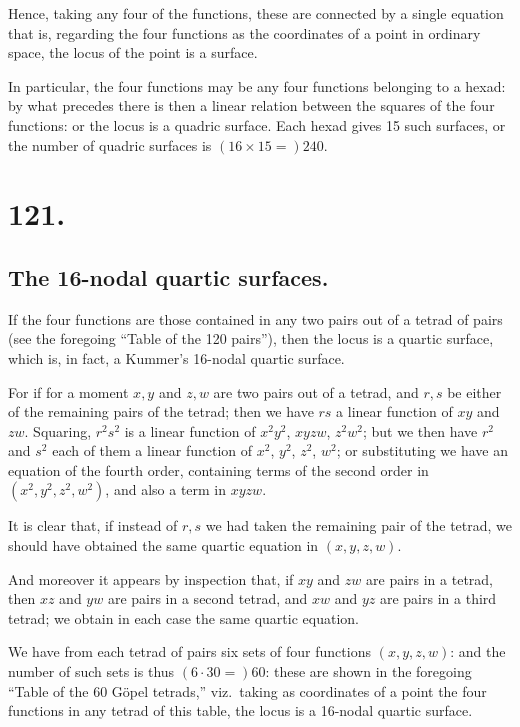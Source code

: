 \documentclass[11pt,a4paper]{book}
\begin{document}
Hence, taking any four of the functions, these are connected by a single equation that is, regarding the four functions as the coordinates of a point in ordinary space, the locus of the point is a surface.

In particular, the four functions may be any four functions belonging to a hexad: by what precedes there is then a linear relation between the squares of the four functions: or the locus is a quadric surface. Each hexad gives 15 such surfaces, or the number of quadric surfaces is $(16 \times 15 =) 240$.

\newpage
\section*{121.}
\label{sec:121}

\subsection*{The 16-nodal quartic surfaces.}

If the four functions are those contained in any two pairs out of a tetrad of pairs (see the foregoing ``Table of the 120 pairs''), then the locus is a quartic surface, which is, in fact, a Kummer's 16-nodal quartic surface.

For if for a moment $x,y$ and $z,w$ are two pairs out of a tetrad, and $r,s$ be either of the remaining pairs of the tetrad; then we have $rs$ a linear function of $xy$ and $zw$. Squaring, $r^2s^2$ is a linear function of $x^2y^2$, $xyzw$, $z^2w^2$; but we then have $r^2$ and $s^2$ each of them a linear function of $x^2$, $y^2$, $z^2$, $w^2$; or substituting we have an equation of the fourth order, containing terms of the second order in $(x^2, y^2, z^2, w^2)$, and also a term in $xyzw$.

It is clear that, if instead of $r,s$ we had taken the remaining pair of the tetrad, we should have obtained the same quartic equation in $(x, y, z, w)$.

And moreover it appears by inspection that, if $xy$ and $zw$ are pairs in a tetrad, then $xz$ and $yw$ are pairs in a second tetrad, and $xw$ and $yz$ are pairs in a third tetrad; we obtain in each case the same quartic equation.

We have from each tetrad of pairs six sets of four functions $(x, y, z, w)$: and the number of such sets is thus $(6 \cdot 30 =) 60$: these are shown in the foregoing ``Table of the 60 G\"{o}pel tetrads,'' viz.\ taking as coordinates of a point the four functions in any tetrad of this table, the locus is a 16-nodal quartic surface.
\end{document}
